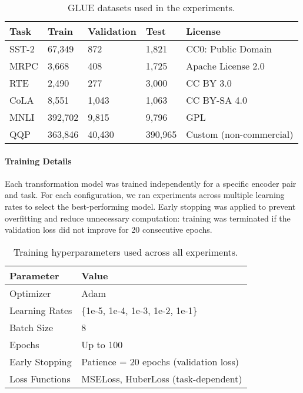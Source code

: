 \begin{table}[H]
\centering
\caption{GLUE datasets used in the experiments.}
\label{tab:glueDs}
\begin{tabular}{l l l l l}
\toprule
\textbf{Task} & \textbf{Train} & \textbf{Validation} & \textbf{Test} & \textbf{License} \\
\midrule
SST-2 & 67,349  & 872   & 1,821  & CC0: Public Domain \\
MRPC & 3,668   & 408   & 1,725  & Apache License 2.0 \\
RTE & 2,490   & 277   & 3,000  & CC BY 3.0 \\
CoLA & 8,551   & 1,043 & 1,063  & CC BY-SA 4.0 \\
MNLI & 392,702 & 9,815 & 9,796  &  GPL \\
QQP & 363,846 & 40,430 & 390,965 & Custom (non-commercial) \\
\bottomrule
\end{tabular}
\end{table}



\paragraph{Training Details}

Each transformation model was trained independently for a specific encoder pair and task.
For each configuration, we ran experiments across multiple learning rates to select the best-performing model.
Early stopping was applied to prevent overfitting and reduce unnecessary computation: training was terminated if the validation loss did not improve for 20 consecutive epochs.

\begin{table}[H]
\centering
\caption{Training hyperparameters used across all experiments.}
\label{tab:training-hyperparameters}
\begin{tabular}{ll}
\toprule
\textbf{Parameter} & \textbf{Value} \\
\midrule
Optimizer & Adam~\cite{kingma2017adammethodstochasticoptimization} \\
Learning Rates & \{1e-5, 1e-4, 1e-3, 1e-2, 1e-1\} \\
Batch Size & 8 \\
Epochs & Up to 100 \\
Early Stopping & Patience = 20 epochs (validation loss) \\
Loss Functions & MSELoss, HuberLoss (task-dependent) \\
\bottomrule
\end{tabular}
\end{table}



